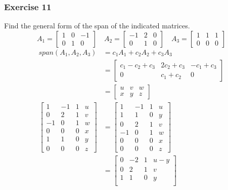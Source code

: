 \documentclass[letterpaper, 12pt]{math}
\begin{document}
\subsubsection*{Exercise 11}
Find the general form of the span of the indicated matrices.
\[ A_1 = \begin{bmatrix}1 & 0 & -1 \\ 0 & 1 & 0\end{bmatrix} \quad
  A_2 = \begin{bmatrix}-1 & 2 & 0 \\ 0 & 1 & 0\end{bmatrix} \quad
  A_3 = \begin{bmatrix}1 & 1 & 1 \\ 0 & 0 & 0\end{bmatrix} \]
\begin{align*}
  span(A_1,A_2,A_3) &= c_1A_1+c_2A_2+c_3A_3 \\
  &= \begin{bmatrix}
    c_1-c_2+c_3 & 2c_2+c_3 & -c_1+c_3 \\
    0 & c_1+c_2 & 0
  \end{bmatrix} \\
  &= \begin{bmatrix}
    u & v & w \\
    x & y & z
  \end{bmatrix} \\
  \begin{bmatrix}
    1 & -1 & 1 & u \\
    0 & 2 & 1 & v \\
    -1 & 0 & 1 & w \\
    0 & 0 & 0 & x \\
    1 & 1 & 0 & y \\
    0 & 0 & 0 & z
  \end{bmatrix} &= \begin{bmatrix}
    1 & -1 & 1 & u \\
    1 & 1 & 0 & y \\
    0 & 2 & 1 & v \\
    -1 & 0 & 1 & w \\
    0 & 0 & 0 & x \\
    0 & 0 & 0 & z
  \end{bmatrix} \\
  &= \begin{bmatrix}
    0 & -2 & 1 & u-y \\
    0 & 2 & 1 & v \\
    1 & 1 & 0 & y \\

\end{bmatrix}
\end{align*}
\end{document}
